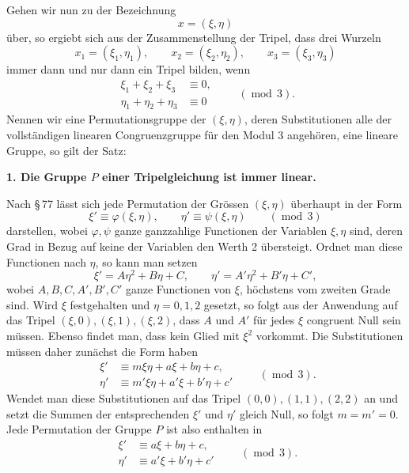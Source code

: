 \documentclass[11pt]{article}
\begin{document}
Gehen wir nun zu der Bezeichnung
\begin{equation}
 x=(\xi,\eta)
 \tag{1}
\end{equation}
über, so ergiebt sich aus der Zusammenstellung der Tripel, dass drei Wurzeln
\begin{equation}
 x_1=(\xi_1,\eta_1),\qquad x_2=(\xi_2,\eta_2),\qquad x_3=(\xi_3,\eta_3)
 \tag{2}
\end{equation}
immer dann und nur dann ein Tripel bilden, wenn
\begin{equation}
\begin{aligned}
 \xi_1+\xi_2+\xi_3&\equiv 0,\\
 \eta_1+\eta_2+\eta_3&\equiv 0
\end{aligned}
\qquad (\operatorname{mod}\,3).
\tag{3}
\end{equation}
Nennen wir eine Permutationsgruppe der \((\xi,\eta)\), deren Substitutionen alle der vollständigen linearen Congruenzgruppe für den Modul 3 angehören, eine lineare Gruppe, so gilt der Satz:

\textbf{1. Die Gruppe \(P\) einer Tripelgleichung ist immer linear.}

Nach \S\,77 lässt sich jede Permutation der Grössen \((\xi,\eta)\) überhaupt in der Form
\begin{equation}
 \xi'\equiv \varphi(\xi,\eta),\qquad \eta'\equiv \psi(\xi,\eta)
 \qquad(\operatorname{mod}\,3)
 \tag{4}
\end{equation}
darstellen, wobei \(\varphi,\psi\) ganze ganzzahlige Functionen der Variablen \(\xi,\eta\) sind, deren Grad in Bezug auf keine der Variablen den Werth 2 übersteigt. Ordnet man diese Functionen nach \(\eta\), so kann man setzen
\begin{equation}
 \xi'=A\eta^2+B\eta+C,
 \qquad
 \eta'=A'\eta^2+B'\eta+C',
 \tag{5}
\end{equation}
wobei \(A,B,C,A',B',C'\) ganze Functionen von \(\xi\), höchstens vom zweiten Grade sind. Wird \(\xi\) festgehalten und \(\eta=0,1,2\) gesetzt, so folgt aus der Anwendung auf das Tripel \((\xi,0),(\xi,1),(\xi,2)\), dass \(A\) und \(A'\) für jedes \(\xi\) congruent Null sein müssen. Ebenso findet man, dass kein Glied mit \(\xi^2\) vorkommt. Die Substitutionen müssen daher zunächst die Form haben
\[
\begin{aligned}
 \xi'&\equiv m\xi\eta+a\xi+b\eta+c,\\
 \eta'&\equiv m'\xi\eta+a'\xi+b'\eta+c'
\end{aligned}
\qquad(\operatorname{mod}\,3).
\]
Wendet man diese Substitutionen auf das Tripel \((0,0),(1,1),(2,2)\) an und setzt die Summen der entsprechenden \(\xi'\) und \(\eta'\) gleich Null, so folgt \(m=m'=0\). Jede Permutation der Gruppe \(P\) ist also enthalten in
\begin{equation}
\begin{aligned}
 \xi'&\equiv a\xi+b\eta+c,\\
 \eta'&\equiv a'\xi+b'\eta+c'
\end{aligned}
\qquad(\operatorname{mod}\,3).
\tag{6}
\end{equation}
\end{document}
